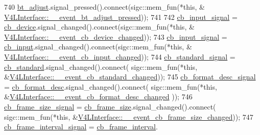 \begin{DoxyCode}
740         \hyperlink{class_v_s_s_s___g_u_i_1_1_v4_l_interface_a0d17ffdc7f7792c2d37bcda12c700133}{bt\_adjust}.signal\_pressed().connect(sigc::mem\_fun(*\textcolor{keyword}{this}, &
      \hyperlink{class_v_s_s_s___g_u_i_1_1_v4_l_interface_ab8a8006db395031e305519fd3e199928}{V4LInterface::\_\_event\_bt\_adjust\_pressed}));
741 
742         \hyperlink{class_v_s_s_s___g_u_i_1_1_v4_l_interface_a8c1c8e5183da12874fb0aa89c323a512}{cb\_input\_signal} = \hyperlink{class_v_s_s_s___g_u_i_1_1_v4_l_interface_a9aebd92fe12b9b5acc25b1113dbd022e}{cb\_device}.signal\_changed().connect(sigc::mem\_fun(*\textcolor{keyword}{this}, &
      \hyperlink{class_v_s_s_s___g_u_i_1_1_v4_l_interface_af38c88f726a7ff9fab089ab9ed20c03c}{V4LInterface::\_\_event\_cb\_device\_changed}));
743         \hyperlink{class_v_s_s_s___g_u_i_1_1_v4_l_interface_a8c1c8e5183da12874fb0aa89c323a512}{cb\_input\_signal} = \hyperlink{class_v_s_s_s___g_u_i_1_1_v4_l_interface_af7c647eefb3e6f7cf8e0fdc170619922}{cb\_input}.signal\_changed().connect(sigc::mem\_fun(*\textcolor{keyword}{this}, &
      \hyperlink{class_v_s_s_s___g_u_i_1_1_v4_l_interface_a09e546d62cf2363590490c2f9e85c951}{V4LInterface::\_\_event\_cb\_input\_changed}));
744         \hyperlink{class_v_s_s_s___g_u_i_1_1_v4_l_interface_a2ef0bde4e5eba4c9a1268de79963cbad}{cb\_standard\_signal} = \hyperlink{class_v_s_s_s___g_u_i_1_1_v4_l_interface_ae78aa74f420bbb92b59ff0e0f0ac3b1e}{cb\_standard}.signal\_changed().connect(
      sigc::mem\_fun(*\textcolor{keyword}{this}, &\hyperlink{class_v_s_s_s___g_u_i_1_1_v4_l_interface_adaa2a6e1946bb639d5be0ec3eb03cdb5}{V4LInterface::\_\_event\_cb\_standard\_changed}));
745         \hyperlink{class_v_s_s_s___g_u_i_1_1_v4_l_interface_a01fe3a5a8d0f0bfa6bb19cdcb138b38d}{cb\_format\_desc\_signal} = \hyperlink{class_v_s_s_s___g_u_i_1_1_v4_l_interface_a1f6b2f08ccbc0ecbfba96311ac07aa44}{cb\_format\_desc}.signal\_changed().connect(
      sigc::mem\_fun(*\textcolor{keyword}{this}, &\hyperlink{class_v_s_s_s___g_u_i_1_1_v4_l_interface_a41dc791b309dcb6e4469c6cc9d4a4852}{V4LInterface::\_\_event\_cb\_format\_desc\_changed}
      ));
746         \hyperlink{class_v_s_s_s___g_u_i_1_1_v4_l_interface_a1da538d681305543a819948f21eae6c2}{cb\_frame\_size\_signal} = \hyperlink{class_v_s_s_s___g_u_i_1_1_v4_l_interface_ad6dd4704d3b7d1f262843dd148269b73}{cb\_frame\_size}.signal\_changed().connect(
      sigc::mem\_fun(*\textcolor{keyword}{this}, &\hyperlink{class_v_s_s_s___g_u_i_1_1_v4_l_interface_a49e6f69de18f2bcb54db964375535e9f}{V4LInterface::\_\_event\_cb\_frame\_size\_changed}));
747         \hyperlink{class_v_s_s_s___g_u_i_1_1_v4_l_interface_a4f91a6951069a2775009886057d2900d}{cb\_frame\_interval\_signal} = \hyperlink{class_v_s_s_s___g_u_i_1_1_v4_l_interface_ad07b3bbad672e676e128f19a12f07e73}{cb\_frame\_interval}.

\end{DoxyCode}
